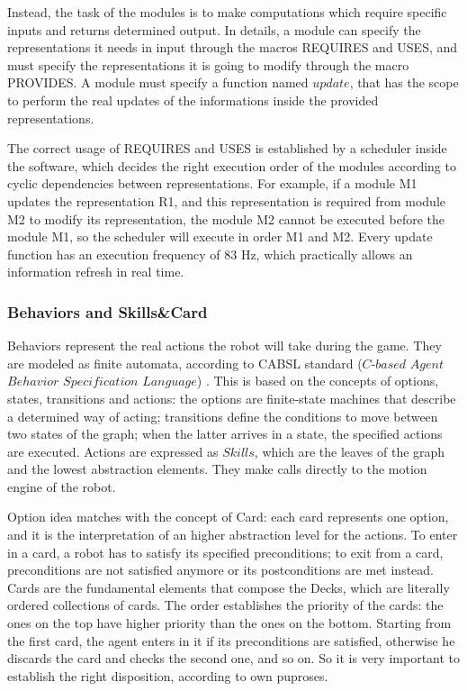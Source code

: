\documentclass[a4paper, onecolumn, 12pt]{article}
\begin{document}
Instead, the task of the modules is to make computations which require specific inputs and returns
determined output. In details, a module can specify the representations it needs in input through
the macros REQUIRES and USES, and must specify the representations it is going to modify through
the macro PROVIDES. A module must specify a function named $update$, that has the scope to 
perform the real updates of the informations inside the provided representations.

The correct usage of REQUIRES and USES is established by a scheduler inside the software, which decides 
the right execution order of the modules according to cyclic dependencies between representations.
For example, if a module M1 updates the representation R1, and this representation is required from 
module M2 to modify its representation, the module M2 cannot be executed before the module M1, so the
scheduler will execute in order M1 and M2. 
Every update function has an execution frequency of 83 Hz, which practically allows an information 
refresh in real time.

\subsubsection{Behaviors and Skills\&Card}
Behaviors represent the real actions the robot will take during the game. They are modeled as finite 
automata, according to CABSL standard ($C$-$based$ $Agent$ $Behavior$ $Specification$ $Language$) \cite{}.
This is based on the concepts of options, states, transitions and actions: the options are finite-state machines that
describe a determined way of acting; transitions define the conditions to move between two states of the graph; 
when the latter arrives in a state, the specified actions are executed.
Actions are expressed as $Skills$, which are the leaves of the graph and the lowest abstraction elements.
They make calls directly to the motion engine of the robot.

Option idea matches with the concept of Card: each card represents one option, and it is the interpretation
of an higher abstraction level for the actions. 
To enter in a card, a robot has to satisfy its specified preconditions; to exit from a card, preconditions are not
satisfied anymore or its postconditions are met instead.
Cards are the fundamental elements that compose the Decks, which are literally ordered collections of cards.
The order establishes the priority of the cards: the ones on the top have higher priority than the ones on the bottom.
Starting from the first card, the agent enters in it if its preconditions are satisfied, otherwise he discards 
the card and checks the second one, and so on. So it is very important to establish the right disposition,
according to own puproses. 
\end{document}

